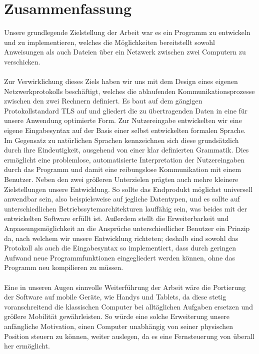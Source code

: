 %

%
\section*{Zusammenfassung}
Unsere grundlegende Zielstellung der Arbeit war es ein Programm zu entwickeln und zu implementieren, welches die Möglichkeiten bereitstellt sowohl Anweisungen als auch Dateien über ein Netzwerk zwischen zwei Computern zu verschicken.\\\\
Zur Verwirklichung dieses Ziels haben wir uns mit dem Design eines eigenen Netzwerkprotokolls beschäftigt, welches die ablaufenden Kommunikationsprozesse zwischen den zwei Rechnern definiert. 
Es baut auf dem gängigen Protokollstandard TLS auf und gliedert die zu übertragenden Daten in eine für unsere Anwendung optimierte Form. 
Zur Nutzereingabe entwickelten wir eine eigene Eingabesyntax auf der Basis einer selbst entwickelten formalen Sprache. 
Im Gegensatz zu natürlichen Sprachen kennzeichnen sich diese grundsätzlich durch ihre Eindeutigkeit, ausgehend von einer klar definierten Grammatik. 
Dies ermöglicht eine problemlose, automatisierte Interpretation der Nutzereingaben durch das Programm und damit eine reibungslose Kommunikation mit einem Benutzer.
Neben den zwei größeren Unterzielen prägten auch mehre kleinere Zielstellungen unsere Entwicklung.
So sollte das Endprodukt möglichst universell anwendbar sein, also beispielsweise auf jegliche Datentypen, und es sollte auf unterschiedlichen Betriebssytemarchitekturen lauffähig sein, was beides mit der entwickelten Software erfüllt ist.
Außerdem stellt die Erweiterbarkeit und Anpassungsmöglichkeit an die Ansprüche unterschiedlicher Benutzer ein Prinzip da, nach welchem wir unsere Entwicklung richteten; deshalb sind sowohl das Protokoll als auch die Eingabesyntax so implementiert, dass durch geringen Aufwand neue Programmfunktionen eingegliedert werden können, ohne das Programm neu kompilieren zu müssen.\\\\
Eine in unseren Augen sinnvolle Weiterführung der Arbeit wäre die Portierung der Software auf mobile Geräte, wie Handys und Tablets, da diese stetig voranschreitend die klassischen Computer bei alltäglichen Aufgaben ersetzen und größere Mobilität gewährleisten. 
So würde eine solche Erweiterung unsere anfängliche Motivation, einen Computer unabhängig von seiner physischen Position steuern zu können, weiter auslegen, da es eine Fernsteuerung von überall her ermöglicht. 
